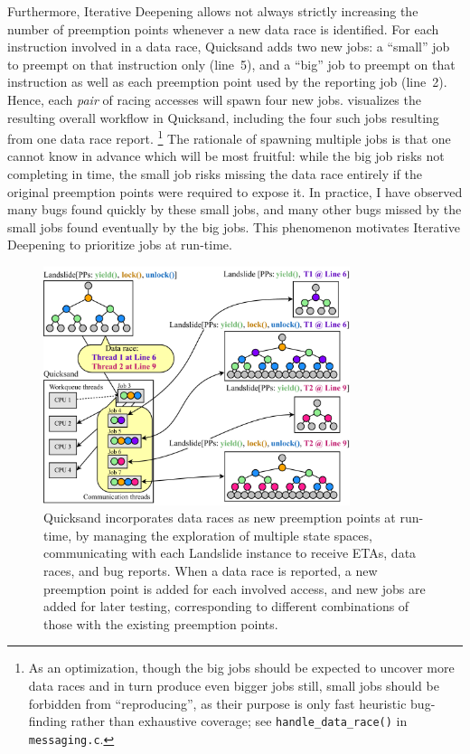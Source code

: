 Furthermore,
Iterative Deepening allows not always strictly increasing the number of preemption points
whenever a new data race is identified.
For each instruction involved in a data race, Quicksand adds two new jobs:
a ``small'' job to preempt on that instruction only (line~5),
and a ``big'' job to preempt on that instruction as well as each preemption point used by the reporting job (line~2).
%
Hence,
each {\em pair} of racing accesses will spawn four new jobs.
 visualizes the resulting overall workflow in Quicksand,
including the four such jobs resulting from one data race report.%
\footnote{As an optimization,
though the big jobs should be expected to uncover more data races and in turn
produce even bigger jobs still,
small jobs should be forbidden from ``reproducing'',
as their purpose is only fast heuristic bug-finding rather than exhaustive coverage;
see {\tt handle\_data\_race()} in {\tt messaging.c}.}
%
The rationale of spawning multiple jobs is that one cannot know in advance which will be most fruitful:
while the big job risks not completing in time,
the small job risks missing the data race entirely if the original preemption points were required to expose it.
In practice, I have observed many bugs found quickly by these small jobs,
and many other bugs missed by the small jobs found eventually by the big jobs.
This phenomenon motivates Iterative Deepening to prioritize jobs at run-time.

\begin{figure}[t]
	\begin{center}
        \includegraphics[width=0.8\textwidth]{dr-jobs-v2.pdf}
	\end{center}
	\caption[Quicksand incorporates data races as new preemption points at run-time.]
		{Quicksand incorporates data races as new preemption points at run-time,
		by managing the exploration of multiple state spaces,
		communicating with each Landslide instance to receive ETAs, data races, and bug reports.
                When a data race is reported,
                a new preemption point is added for each involved access,
                and new jobs are added for later testing,
                corresponding to different combinations of those with the existing preemption points.}
        \label{fig:new-dr-jobs}
\end{figure}

